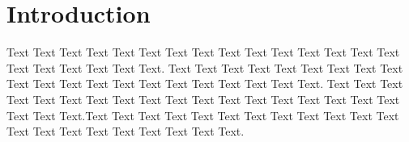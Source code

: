 \section{Introduction}

%
%
Text Text Text Text Text Text  Text Text Text Text Text Text Text Text Text  Text Text Text Text Text Text. Text Text Text Text Text Text  Text Text Text Text Text Text Text Text Text  Text Text Text Text Text Text. Text Text Text Text Text Text  Text Text Text Text Text Text Text Text Text  Text Text Text Text Text Text.Text Text Text Text Text Text  Text Text Text Text Text Text Text Text Text  Text Text Text Text Text Text.
